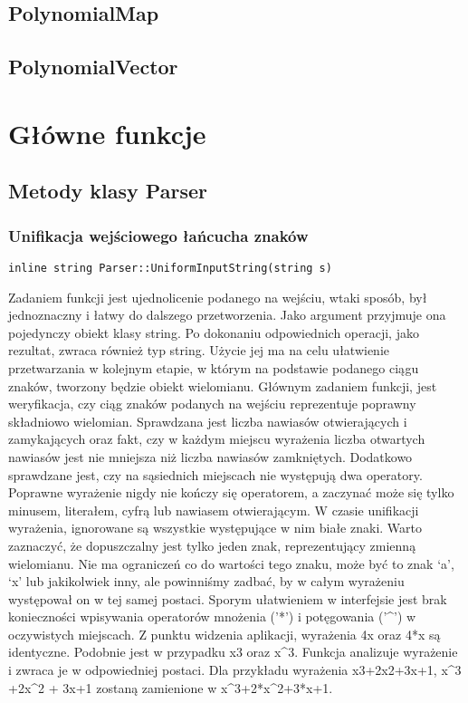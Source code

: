 \documentclass[twoside,a4paper]{book}
\begin{document}
\subsection{PolynomialMap}

\subsection{PolynomialVector}



\section{Główne funkcje}

\subsection{Metody klasy Parser}

\subsubsection{Unifikacja wejściowego łańcucha znaków}
\begin{lstlisting}
inline string Parser::UniformInputString(string s)
\end{lstlisting}

Zadaniem funkcji jest ujednolicenie podanego na wejściu, wtaki sposób, był jednoznaczny i łatwy do dalszego przetworzenia. Jako argument przyjmuje ona pojedynczy obiekt klasy string. Po dokonaniu odpowiednich operacji, jako rezultat, zwraca również typ string. Użycie jej ma na celu ułatwienie przetwarzania w kolejnym etapie, w którym na podstawie podanego ciągu znaków, tworzony będzie obiekt wielomianu. Głównym zadaniem funkcji, jest weryfikacja, czy ciąg znaków podanych na wejściu reprezentuje poprawny składniowo wielomian. Sprawdzana jest liczba nawiasów otwierających i zamykających oraz fakt, czy w każdym miejscu wyrażenia liczba otwartych nawiasów jest nie mniejsza niż liczba nawiasów zamkniętych. Dodatkowo sprawdzane jest, czy na sąsiednich miejscach nie występują dwa operatory. Poprawne wyrażenie nigdy nie kończy się operatorem, a zaczynać może się tylko minusem, literałem, cyfrą lub nawiasem otwierającym. W czasie unifikacji wyrażenia, ignorowane są wszystkie występujące w nim białe znaki. Warto zaznaczyć, że dopuszczalny jest tylko jeden znak, reprezentujący zmienną wielomianu. Nie ma ograniczeń co do wartości tego znaku, może być to znak ‘a’, ‘x’ lub jakikolwiek inny, ale powinniśmy zadbać, by w całym wyrażeniu występował on w tej samej postaci. Sporym ułatwieniem w interfejsie jest brak konieczności wpisywania operatorów mnożenia ('*') i potęgowania ('\^{}') w oczywistych miejscach. Z punktu widzenia aplikacji, wyrażenia 4x oraz 4*x są identyczne. Podobnie jest w przypadku x3 oraz x\^{}3. Funkcja analizuje wyrażenie i zwraca je w odpowiedniej postaci. Dla przykładu wyrażenia x3+2x2+3x+1, x\^{}3 +2x\^{}2 + 3x+1 zostaną zamienione w x\^{}3+2*x\^{}2+3*x+1.
\\
\end{document}
